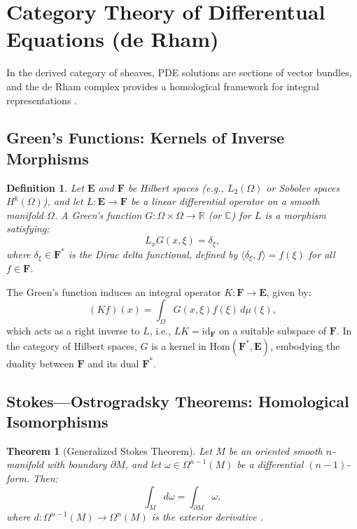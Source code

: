\documentclass{article}
\theoremstyle{plain}
\newtheorem{theorem}{Theorem}[section]
\newtheorem{definition}{Definition}[section]
\newcommand{\cat}[1]{\mathbf{#1}}
\newcommand{\Hom}{\mathrm{Hom}}
\newcommand{\id}{\mathrm{id}}
\begin{document}
\section{Category Theory of Differentual Equations (de Rham)}
In the derived category of sheaves, PDE solutions are sections of vector bundles,
and the de Rham complex provides a homological framework for integral representations \cite{nLab_de_Rham_theorem}.

\subsection{Green's Functions: Kernels of Inverse Morphisms}

\begin{definition}
Let \(\cat{E}\) and \(\cat{F}\) be Hilbert spaces (e.g., \(L_2(\Omega)\)
or Sobolev spaces \(H^k(\Omega)\)), and let \(L: \cat{E} \to \cat{F}\)
be a linear differential operator on a smooth manifold \(\Omega\).
A \emph{Green's function} \(G: \Omega \times \Omega \to \mathbb{R}\)
(or \(\mathbb{C}\)) for \(L\) is a morphism satisfying:
\[
L_x G(x, \xi) = \delta_\xi,
\]
where \(\delta_\xi \in \cat{F}^*\) is the Dirac delta functional,
defined by \(\langle \delta_\xi, f \rangle = f(\xi)\) for all \(f \in \cat{F}\).
\end{definition}

The Green's function induces an integral operator \(K: \cat{F} \to \cat{E}\), given by:
\[
(K f)(x) = \int_\Omega G(x, \xi) f(\xi) \, d\mu(\xi),
\]
which acts as a right inverse to \(L\), i.e., \(L K = \id_{\cat{F}}\)
on a suitable subspace of \(\cat{F}\). In the category of Hilbert spaces,
\(G\) is a kernel in \(\Hom(\cat{F}^*, \cat{E})\), embodying the duality
between \(\cat{F}\) and its dual \(\cat{F}^*\).

\subsection{Stokes---Ostrogradsky Theorems: Homological Isomorphisms}

\begin{theorem}[Generalized Stokes Theorem]
Let \(M\) be an oriented smooth \(n\)-manifold with boundary \(\partial M\), and let \(\omega \in \Omega^{n-1}(M)\) be a differential \((n-1)\)-form. Then:
\[
\int_M d\omega = \int_{\partial M} \omega,
\]
where \(d: \Omega^{n-1}(M) \to \Omega^n(M)\) is the exterior derivative \cite{nLab_stokes_theorem}.
\end{theorem}
\end{document}

